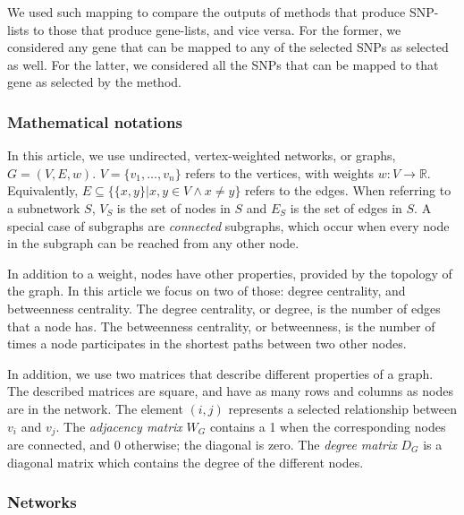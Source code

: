 \documentclass[draft,twocolumn, 11pt]{article}
\begin{document}
We used such mapping to compare the outputs of methods that produce SNP-lists to those that produce gene-lists, and vice versa. For the former, we considered any gene that can be mapped to any of the selected SNPs as selected as well. For the latter, we considered all the SNPs that can be mapped to that gene as selected by the method.

\subsubsection{Mathematical notations}
\label{methods:notation}
In this article, we use undirected, vertex-weighted networks, or graphs, $G = (V,E,w)$. $V = \{v_{1}, \dots{}, v_{n}\}$ refers to the vertices, with weights $w: V \rightarrow \mathbb{R}$. Equivalently, $E \subseteq \{\{x,y\} | x,y \in V \wedge x \neq y\}$ refers to the edges. When referring to a subnetwork $S$, $V_{S}$ is the set of nodes in $S$ and $E_{S}$ is the set of edges in $S$. A special case of subgraphs are \emph{connected} subgraphs, which occur when every node in the subgraph can be reached from any other node.

In addition to a weight, nodes have other properties, provided by the topology of the graph. In this article we focus on two of those: degree centrality, and betweenness centrality. The degree centrality, or degree, is the number of edges that a node has. The betweenness centrality, or betweenness, is the number of times a node participates in the shortest paths between two other nodes.

In addition, we use two matrices that describe different properties of a graph. The described matrices are square, and have as many rows and columns as nodes are in the network. The element $(i,j)$ represents a  selected relationship between $v_i$ and $v_j$. The \emph{adjacency matrix} $W_G$ contains a 1 when the corresponding nodes are connected, and 0 otherwise; the diagonal is zero. The \emph{degree matrix} $D_G$ is a diagonal matrix which contains the degree of the different nodes.

\subsubsection{Networks}
\label{methods:networks}
\end{document}
